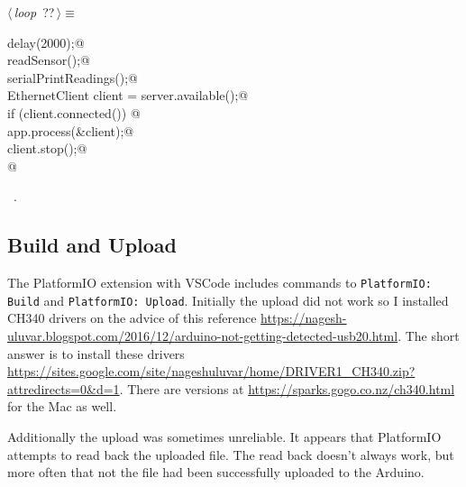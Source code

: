 \documentclass[a4paper, 11pt]{article}
\begin{document}
\begin{flushleft} \small
\begin{minipage}{\linewidth}\label{scrap13}\raggedright\small
{}$\langle\,${\itshape loop}\nobreak\ {\footnotesize{??}}$\,\rangle\equiv$
\vspace{-1ex}
\begin{list}{}{\setlength{\leftmargin}{1em}} \item
\mbox{}\lstinline@  delay(2000);@\\
\mbox{}\lstinline@  readSensor();@\\
\mbox{}\lstinline@  serialPrintReadings();@\\
\mbox{}\lstinline@  EthernetClient client = server.available();@\\
\mbox{}\lstinline@  if (client.connected()) {@\\
\mbox{}\lstinline@    app.process(&client);@\\
\mbox{}\lstinline@    client.stop();@\\
\mbox{}\lstinline@  }@\\
\mbox{}{\NWsep}
\end{list}
\vspace{-1ex}
\vspace{-1ex}
\footnotesize
\begin{list}{}{\setlength{\itemsep}{-\parsep}\setlength{\itemindent}{-\leftmargin}}
\item \NWtxtMacroRefIn\ .
\end{list}
\end{minipage}
\end{flushleft}

\subsection{Build and Upload}

The PlatformIO extension with VSCode includes
commands to 
\verb|PlatformIO: Build|
and
\verb|PlatformIO: Upload|.
Initially the upload did not work so I installed CH340 drivers
on the advice of this reference \url{https://nagesh-uluvar.blogspot.com/2016/12/arduino-not-getting-detected-usb20.html}.
The short answer is to install these drivers \url{https://sites.google.com/site/nageshuluvar/home/DRIVER1_CH340.zip?attredirects=0&d=1}.
There are versions at \url{https://sparks.gogo.co.nz/ch340.html} for the Mac as well.

Additionally the upload was sometimes unreliable.
It appears that PlatformIO attempts to read back the uploaded file.
The read back doesn't always work,
but more often that not the file had been successfully uploaded to the Arduino.
\end{document}
